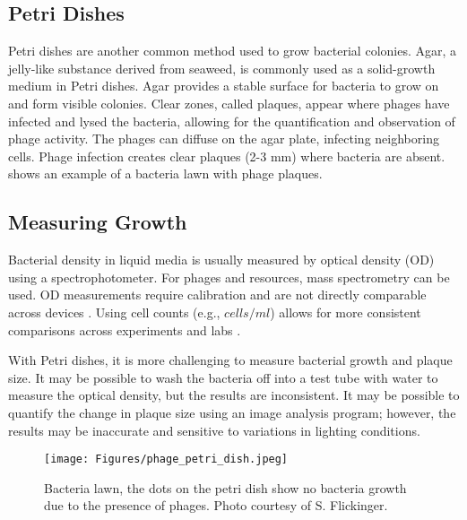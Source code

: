 \subsection{Petri Dishes}
Petri dishes are another common method used to grow bacterial colonies. 
Agar, a jelly-like substance derived from seaweed, is commonly used as a solid-growth medium in Petri dishes. 
Agar provides a stable surface for bacteria to grow on and form visible colonies. 
Clear zones, called plaques, appear where phages have infected and lysed the bacteria, allowing for the quantification and observation of phage activity. 
The phages can diffuse on the agar plate, infecting neighboring cells. 
Phage infection creates clear plaques (2-3 mm) where bacteria are absent. 
 shows an example of a bacteria lawn with phage plaques. 

\subsection{Measuring Growth}
Bacterial density in liquid media is usually measured by optical density (OD) using a spectrophotometer. 
For phages and resources, mass spectrometry can be used. OD measurements require calibration and are not directly comparable across devices \cite{bealRobustEstimationBacterial2020}. 
Using cell counts (e.g., $cells/ml$) allows for more consistent comparisons across experiments and labs \cite{miraEstimatingMicrobialPopulation2022}.

With Petri dishes, it is more challenging to measure bacterial growth and plaque size. 
It may be possible to wash the bacteria off into a test tube with water to measure the optical density, but the results are inconsistent. 
It may be possible to quantify the change in plaque size using an image analysis program; however, the results may be inaccurate and sensitive to variations in lighting conditions. 

\begin{figure}[h!]
    \texttt{[image: Figures/phage\_petri\_dish.jpeg]}
    \centering
    \caption{
        Bacteria lawn, the dots on the petri dish show no bacteria growth due to the presence of phages. 
        Photo courtesy of S. Flickinger. 
    }
    \label{fig:phage_petri_dish}
\end{figure}

